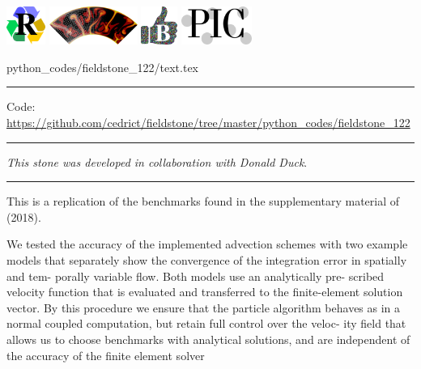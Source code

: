 \noindent
\includegraphics[height=1.25cm]{images/pictograms/replication}
\includegraphics[height=1.25cm]{images/pictograms/aspect_logo}
\includegraphics[height=1.25cm]{images/pictograms/benchmark}
\includegraphics[height=1.25cm]{images/pictograms/pic}


\begin{flushright} {\tiny {\color{gray} python\_codes/fieldstone\_122/text.tex}} \end{flushright}

%

\par\noindent\rule{\textwidth}{0.4pt}

\begin{center}
\inpython
{\small Code: \url{https://github.com/cedrict/fieldstone/tree/master/python_codes/fieldstone_122}}
\end{center}

\par\noindent\rule{\textwidth}{0.4pt}

{\sl This stone was developed in collaboration with Donald Duck}. 

\par\noindent\rule{\textwidth}{0.4pt}


This \stone is a replication of the benchmarks found in the supplementary material 
of \textcite{galh18} (2018). 

\begin{displayquote}
We tested the accuracy of the implemented advection
schemes with two example models that separately show the
convergence of the integration error in spatially and tem-
porally variable flow. Both models use an analytically pre-
scribed velocity function that is evaluated and transferred
to the finite-element solution vector. By this procedure we
ensure that the particle algorithm behaves as in a normal
coupled computation, but retain full control over the veloc-
ity field that allows us to choose benchmarks with analytical
solutions, and are independent of the accuracy of the finite
element solver
\end{displayquote}

